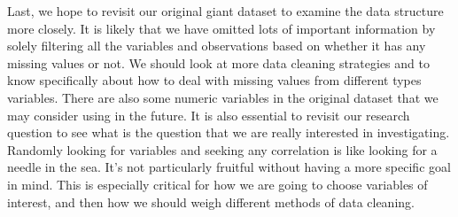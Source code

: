 \documentclass[]{article}
\begin{document}
Last, we hope to revisit our original giant dataset to examine the data
structure more closely. It is likely that we have omitted lots of
important information by solely filtering all the variables and
observations based on whether it has any missing values or not. We
should look at more data cleaning strategies and to know specifically
about how to deal with missing values from different types variables.
There are also some numeric variables in the original dataset that we
may consider using in the future. It is also essential to revisit our
research question to see what is the question that we are really
interested in investigating. Randomly looking for variables and seeking
any correlation is like looking for a needle in the sea. It's not
particularly fruitful without having a more specific goal in mind. This
is especially critical for how we are going to choose variables of
interest, and then how we should weigh different methods of data
cleaning.
\end{document}
